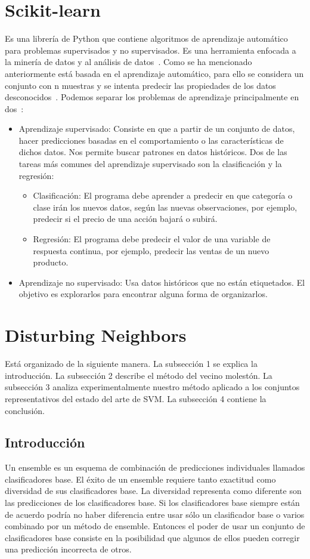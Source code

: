 \section{Scikit-learn}
Es una librería de Python que contiene algoritmos de aprendizaje automático para problemas supervisados y no supervisados. Es una herramienta enfocada a la minería de datos y al análisis de datos~\cite{scikitlearn2}. Como se ha mencionado anteriormente está basada en el aprendizaje automático, para ello se considera un conjunto con n muestras y se intenta predecir las propiedades de los datos desconocidos~\cite{scikitlearn}. Podemos separar los problemas de aprendizaje principalmente en dos~\cite{scikitlearn2}:
	\begin{itemize}
		\item Aprendizaje supervisado: Consiste en que a partir de un conjunto de datos, hacer predicciones basadas en el comportamiento o las características de dichos datos. Nos permite buscar patrones en datos históricos. Dos de las tareas más comunes del aprendizaje supervisado son la clasificación y la regresión:
		
		\begin{itemize}
		 	\item Clasificación: El programa debe aprender a predecir en que categoría o clase irán los nuevos datos, según las nuevas observaciones, por ejemplo, predecir si el precio de una acción bajará o subirá.
		 	\item Regresión: El programa debe predecir el valor de una variable de respuesta continua, por ejemplo, predecir las ventas de un nuevo producto.
		\end{itemize}
		
		\item Aprendizaje no supervisado: Usa datos históricos que no están etiquetados. El objetivo es explorarlos para encontrar alguna forma de organizarlos.
	\end{itemize}


\section{Disturbing Neighbors}
Está organizado de la siguiente manera. La subsección 1 se explica la introducción. La subsección 2 describe el método del vecino molestón. La subsección 3 analiza experimentalmente nuestro método aplicado a los conjuntos representativos del estado del arte de SVM. La subsección 4 contiene la conclusión.
\subsection{Introducción}
Un ensemble es un esquema de combinación de predicciones individuales llamados clasificadores base. El éxito de un ensemble requiere tanto exactitud como diversidad de sus clasificadores base. La diversidad representa como diferente son las predicciones de los clasificadores base. Si los clasificadores base siempre están de acuerdo podría no haber diferencia entre usar sólo un clasificador base o varios combinado por un método de ensemble. Entonces el poder de usar un conjunto de clasificadores base consiste en la posibilidad que algunos de ellos pueden corregir una predicción incorrecta de otros.

